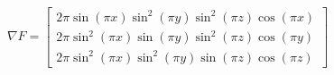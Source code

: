 $$
\nabla F = \left[\begin{matrix}2 \pi \sin{\left(\pi x \right)} \sin^{2}{\left(\pi y \right)} \sin^{2}{\left(\pi z \right)} \cos{\left(\pi x \right)}\\2 \pi \sin^{2}{\left(\pi x \right)} \sin{\left(\pi y \right)} \sin^{2}{\left(\pi z \right)} \cos{\left(\pi y \right)}\\2 \pi \sin^{2}{\left(\pi x \right)} \sin^{2}{\left(\pi y \right)} \sin{\left(\pi z \right)} \cos{\left(\pi z \right)}\end{matrix}\right]
$$
